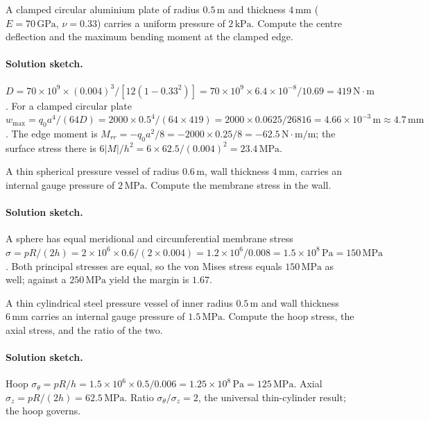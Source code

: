 \begin{exercise}
A clamped circular aluminium plate of radius $0.5\,\si{\meter}$
and thickness $4\,\si{\milli\meter}$ ($E = 70\,\text{GPa}$, $\nu =
0.33$) carries a uniform pressure of $2\,\text{kPa}$. Compute the
centre deflection and the maximum bending moment at the clamped
edge.

\paragraph{Solution sketch.} $D = 70\times 10^9\times (0.004)^3/
[12(1-0.33^2)] = 70\times 10^9\times 6.4\times 10^{-8}/10.69 =
419\,\text{N}\cdot\text{m}$. For a clamped circular plate $w_{\max} =
q_0 a^4/(64D) = 2000\times 0.5^4/(64\times 419) = 2000\times 0.0625/
26816 = 4.66\times 10^{-3}\,\text{m} \approx 4.7\,\si{\milli\meter}$.
The edge moment is $M_{rr} = -q_0 a^2/8 = -2000\times 0.25/8 =
-62.5\,\text{N}\cdot\text{m}/\text{m}$; the surface stress there is
$6|M|/h^2 = 6\times 62.5/(0.004)^2 = 23.4\,\text{MPa}$.
\end{exercise}

\begin{exercise}
A thin spherical pressure vessel of radius $0.6\,\si{\meter}$,
wall thickness $4\,\si{\milli\meter}$, carries an internal gauge
pressure of $2\,\text{MPa}$. Compute the membrane stress in the
wall.

\paragraph{Solution sketch.} A sphere has equal meridional and
circumferential membrane stress $\sigma = pR/(2h) = 2\times 10^6
\times 0.6/(2\times 0.004) = 1.2\times 10^6/0.008 = 1.5\times 10^8\,
\text{Pa} = 150\,\text{MPa}$. Both principal stresses are equal, so
the von Mises stress equals $150\,\text{MPa}$ as well; against a
$250\,\text{MPa}$ yield the margin is $1.67$.
\end{exercise}

\begin{exercise}
A thin cylindrical steel pressure vessel of inner radius $0.5\,
\si{\meter}$ and wall thickness $6\,\si{\milli\meter}$ carries an
internal gauge pressure of $1.5\,\text{MPa}$. Compute the hoop
stress, the axial stress, and the ratio of the two.

\paragraph{Solution sketch.} Hoop $\sigma_\theta = pR/h = 1.5\times
10^6\times 0.5/0.006 = 1.25\times 10^8\,\text{Pa} = 125\,\text{MPa}$.
Axial $\sigma_z = pR/(2h) = 62.5\,\text{MPa}$. Ratio $\sigma_\theta/
\sigma_z = 2$, the universal thin-cylinder result; the hoop governs.
\end{exercise}

